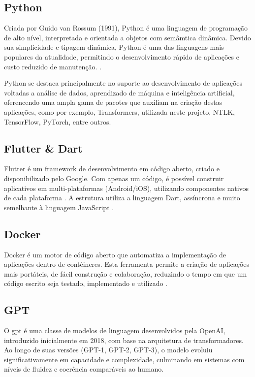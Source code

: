\subsection{Python}\label{subsec:python}

Criada por Guido van Rossum (1991), Python é uma linguagem de programação de alto nível, interpretada e orientada a objetos com semâmtica dinâmica. Devido sua simplicidade e tipagem dinâmica, Python é uma das linguagens mais populares da atualidade, permitindo o desenvolvimento rápido de aplicações e custo reduzido de manutenção. \cite{VanRossum2009}.

Python se destaca principalmente no suporte ao desenvolvimento de aplicações voltadas a análise de dados, aprendizado de máquina e inteligência artificial, oferencendo uma ampla gama de pacotes que auxiliam na criação destas aplicações, como por exemplo, Transformers, utilizada neste projeto, NTLK, TensorFlow, PyTorch, entre outros.

\subsection{Flutter {\&} Dart}\label{subsec:flutterdart}

Flutter é um framework de desenvolvimento em código aberto, criado e disponibilizado pelo Google. Com apenas um código, é possível construir aplicativos em multi-plataformas (Android/iOS), utilizando componentes nativos de cada plataforma \cite{Flutter}. A estrutura utiliza a linguagem Dart, assíncrona e muito semelhante à linguagem JavaScript \cite{Dart}.

\subsection{Docker}\label{subsec:docker}

Docker é um motor de código aberto que automatiza a implementação de aplicações dentro de contêineres. Esta ferramenta permite a criação de aplicações mais portáteis, de fácil construção e colaboração, reduzindo o tempo em que um código escrito seja testado, implementado e utilizado \cite{TheDockerBook}.

\subsection{GPT}\label{subsec:gpt}

O \gls{gpt} é uma classe de modelos de linguagem desenvolvidos pela OpenAI, introduzido inicialmente em 2018, com base na arquitetura de transformadores. Ao longo de suas versões (GPT-1, GPT-2, GPT-3), o modelo evoluiu significativamente em capacidade e complexidade, culminando em sistemas com níveis de fluidez e coerência comparáveis ao humano.

